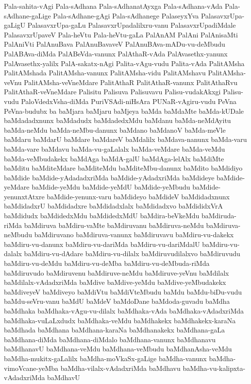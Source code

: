 {Pala-sahita-vAgi
Pala-sAdhana
Pala-sAdhanatAyxga
Pala-sAdhana-vAda
Pala-sAdhane-gaLige
Pala-sAdhane-gAgi
Pala-sAdhanege
PalaseyxYva
PalasavxrUpa-gaLigU
PalasavxrUpa-gaLu
PalasavxrUpadalilxru-vanu
PalasavxrUpadiMdale
PalasavxrUpaveV
Pala-heVtu
Pala-heVtu-gaLa
PalAnAM
PalAni
PalAnisaMti
PalAniVti
PalAnuBava
PalAnuBavaveV
PalAnuBAva-mADu-vu-deMbudu
PalABAva-diMda
PalABeVda-vanunx
PalAthaR-vAda
PalAvasethx-yanunx
PalAvasethx-yalilx
PalA-sakatx-nAgi
Palita-vAgu-vudu
Palita-vAda
PalitAMsha
PalitAMshada
PalitAMsha-vanunx
PalitAMsha-vidu
PalitAMshavu
PalitAMsha-veVnu
PalitAMsha-veVneMdare
PalitAthaR
PalitAthaR-vanunx
PalitAthaRvu
PalitAthaR-veVneMdare
Palisitu
Palisuva
Palisuvavu
Palisu-vudakAkxgi
Palisu-vudu
PaloVdedxVsha-diMda
PuriVSAdi-niHsAra
PUNaR-vAgiru-vudu
PeVna
PeVna-budubx
ba
baMjara
baMjaru
baMjeya
baMda
baMdaMte
baMda-kUDale
baMdadadxnunx
baMdadudx
baMdadedxMdu
baMdanu
baMda-neMdAyitu
baMda-neMdu
baMda-neMbu-danunx
baMdano
baMdanoV
baMda-meVle
baMdaru
baMdarU
baMdare
baMdareV
baMdalilx
baMdava-nanunx
baMda-varu
baMda-vare
baMdavu
baMda-vu-gaLalalx
baMda-veMdare
baMda-veMdu
baMda-veMbudakekx
baMdAga
baMdA-galU
baMdAga-lelAlx
baMdiMte
baMditu
baMditeMdare
baMditeMdu
baMditeMbu-danunx
baMdito
baMdidiyo
baMdide
baMdide-yAdadadxriMda
baMdide-yAdadxriMda
baMdideye
baMdide-yeMdare
baMdide-yeMdu
baMdide-yeMdU
baMdide-yeMbudu
baMdide-yenunxtAtxre
baMdide-yenunx-varu
baMdideyo
baMdideV
baMdidadxnunx
baMdidadxrU
baMdidadxre
baMdidadxlalx
baMdidadxvo
baMdididxVrA
baMdidudx
baMdidedxMdu
baMdidedxMdU
baMdira-beVkeMdu
baMdiruda-riMda
baMdiruva
baMdiru-vaMte
baMdiruvanu
baMdiruva-neMdu
baMdiruva-neMbudu
baMdiruvano
baMdiruva-vanunx
baMdiruvavu
baMdiru-vu-dakekx
baMdiru-vu-danunx
baMdiru-vu-dariMda
baMdiru-vu-dariMdalU
baMdiru-vu-dalalx
baMdiru-vu-dAdare
baMdiru-vu-dilalx
baMdiruvudilalxvo
baMdiruvudu
baMdiru-vu-deMdu
baMdiru-vu-deMba
baMdiru-vu-deMbuda-riMda
baMdiruvudo
baMdiruvenu
baMdiruve-neMdu
baMdiruve-yeVnu
baMdilalx
baMdilalx-vAdadxriMda
baMdive
baMdive-yeMdu
baMdive-yeMbudakekx
baMdiveyeV
baMdiveyo
baMdiVtu
baMdiVteMbudu
baMdu
baMdu-biDu-vudu
baMdu-seVru-vanu
baMdU
baMdeV
baMdoDane
baMdoda-guvadu
baMdha
baMdhaka
baMdhaka-vAgu-vu-dilalx
baMdhaka-vAda
baMdhaka-vAdadxriMda
baMdhaka-vuLaLxdudx
baMdhaka-veMdu
baMdhakekx
baMdhakekx-karaNa
baMdhada
baMdhana
baMdhana-karaNa
baMdhanakekx
baMdhana-gaLa
baMdhana-diMda
baMdhana-diMdalo
baMdhana-vanunx
baMdhanavu
baMdhanavU
baMdhana-veMdu
baMdhana-veMbudu
baMdhanAsha-veMdu
baMdha-mukitx-gaLalilx
baMdha-moVkaSx-gaLige
baMdha-vanunx
baMdha-vimoVcane-yeMba
baMdha-vilalx-vAdadxriMda
baMdhavu
baMdha-vu-kalipxta-vAdadxriMda
baMdhavU
}
